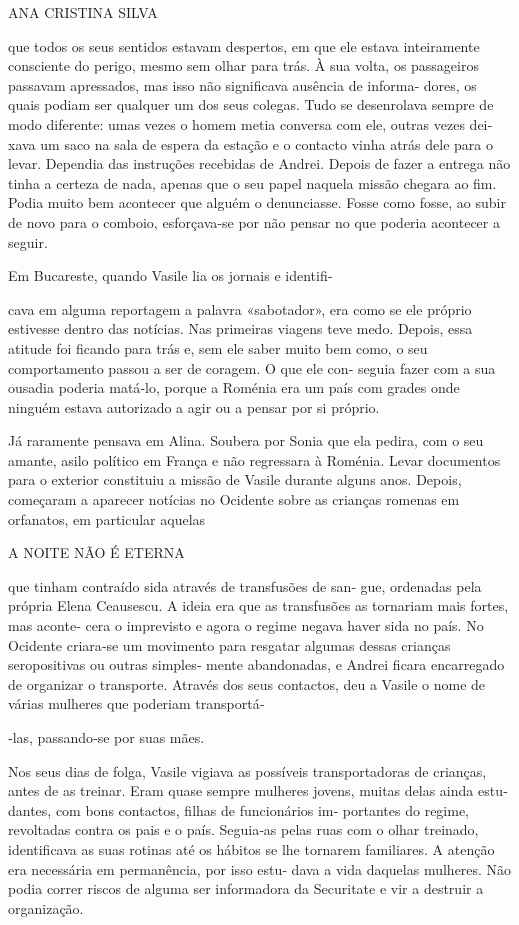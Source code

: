 ANA CRISTINA SILVA

que todos os seus sentidos estavam despertos, em que ele estava
inteiramente consciente do perigo, mesmo sem olhar para trás. À sua
volta, os passageiros passavam apressados, mas isso não significava
ausência de informa‑ dores, os quais podiam ser qualquer um dos seus
colegas. Tudo se desenrolava sempre de modo diferente: umas vezes o
homem metia conversa com ele, outras vezes dei‑ xava um saco na sala de
espera da estação e o contacto vinha atrás dele para o levar. Dependia
das instruções recebidas de Andrei. Depois de fazer a entrega não tinha
a certeza de nada, apenas que o seu papel naquela missão chegara ao fim.
Podia muito bem acontecer que alguém o denunciasse. Fosse como fosse, ao
subir de novo para o comboio, esforçava‑se por não pensar no que poderia
acontecer a seguir.

Em Bucareste, quando Vasile lia os jornais e identifi‑

cava em alguma reportagem a palavra «sabotador», era como se ele próprio
estivesse dentro das notícias. Nas primeiras viagens teve medo. Depois,
essa atitude foi ficando para trás e, sem ele saber muito bem como, o
seu comportamento passou a ser de coragem. O que ele con‑ seguia fazer
com a sua ousadia poderia matá‑lo, porque a Roménia era um país com
grades onde ninguém estava autorizado a agir ou a pensar por si próprio.

Já raramente pensava em Alina. Soubera por Sonia que ela pedira, com o
seu amante, asilo político em França e não regressara à Roménia. Levar
documentos para o exterior constituiu a missão de Vasile durante alguns
anos. Depois, começaram a aparecer notícias no Ocidente sobre as
crianças romenas em orfanatos, em particular aquelas

A NOITE NÃO É ETERNA

que tinham contraído sida através de transfusões de san‑ gue, ordenadas
pela própria Elena Ceausescu. A ideia era que as transfusões as
tornariam mais fortes, mas aconte‑ cera o imprevisto e agora o regime
negava haver sida no país. No Ocidente criara‑se um movimento para
resgatar algumas dessas crianças seropositivas ou outras simples‑ mente
abandonadas, e Andrei ficara encarregado de organizar o transporte.
Através dos seus contactos, deu a Vasile o nome de várias mulheres que
poderiam transportá‑

‑las, passando‑se por suas mães.

Nos seus dias de folga, Vasile vigiava as possíveis transportadoras de
crianças, antes de as treinar. Eram quase sempre mulheres jovens, muitas
delas ainda estu‑ dantes, com bons contactos, filhas de funcionários im‑
portantes do regime, revoltadas contra os pais e o país. Seguia‑as pelas
ruas com o olhar treinado, identificava as suas rotinas até os hábitos
se lhe tornarem familiares. A atenção era necessária em permanência, por
isso estu‑ dava a vida daquelas mulheres. Não podia correr riscos de
alguma ser informadora da Securitate e vir a destruir a organização.

